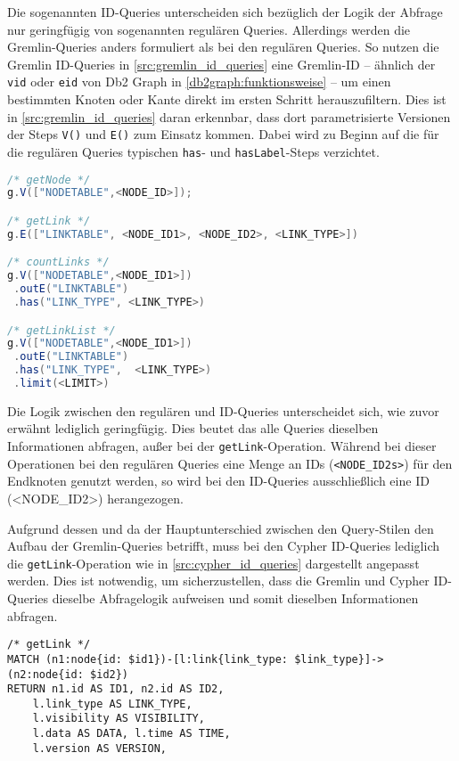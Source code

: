 Die sogenannten ID-Queries unterscheiden sich bezüglich der Logik der Abfrage nur geringfügig von sogenannten regulären Queries. Allerdings werden die Gremlin-Queries anders formuliert als bei den regulären Queries. So nutzen die Gremlin ID-Queries in \autoref{src:gremlin_id_queries} eine Gremlin-ID -- ähnlich der \texttt{vid} oder \texttt{eid} von Db2 Graph in \autoref{db2graph:funktionsweise} -- um einen bestimmten Knoten oder Kante direkt im ersten Schritt herauszufiltern. Dies ist in \autoref{src:gremlin_id_queries} daran erkennbar, dass dort parametrisierte Versionen der Steps \texttt{V()} und \texttt{E()} zum Einsatz kommen. Dabei wird zu Beginn auf die für die regulären Queries typischen \texttt{has}- und \texttt{hasLabel}-Steps verzichtet.

\begin{lstlisting}[label=src:gremlin_id_queries,caption={Gremlin ID-Queries},language=Java]
/* getNode */
g.V(["NODETABLE",<NODE_ID>]);

/* getLink */
g.E(["LINKTABLE", <NODE_ID1>, <NODE_ID2>, <LINK_TYPE>])

/* countLinks */
g.V(["NODETABLE",<NODE_ID1>])
 .outE("LINKTABLE")
 .has("LINK_TYPE", <LINK_TYPE>)

/* getLinkList */
g.V(["NODETABLE",<NODE_ID1>])
 .outE("LINKTABLE")
 .has("LINK_TYPE",  <LINK_TYPE>)
 .limit(<LIMIT>)
\end{lstlisting}

Die Logik zwischen den regulären und ID-Queries unterscheidet sich, wie zuvor erwähnt lediglich geringfügig. Dies beutet das alle Queries dieselben Informationen abfragen, außer bei der \texttt{getLink}-Operation. Während bei dieser Operationen bei den regulären Queries eine Menge an IDs (\texttt{<NODE\_ID2s>}) für den Endknoten genutzt werden, so wird bei den ID-Queries ausschließlich eine ID (<NODE\_ID2>) herangezogen. 

Aufgrund dessen und da der Hauptunterschied zwischen den Query-Stilen den Aufbau der Gremlin-Queries betrifft, muss bei den Cypher ID-Queries lediglich die \texttt{getLink}-Operation wie in \autoref{src:cypher_id_queries} dargestellt
angepasst werden. Dies ist notwendig, um sicherzustellen, dass die Gremlin und Cypher ID-Queries dieselbe Abfragelogik aufweisen und somit dieselben Informationen abfragen. 
\begin{lstlisting}[label=src:cypher_id_queries,caption={Cypher ID-Queries},language=CQL]
/* getLink */
MATCH (n1:node{id: $id1})-[l:link{link_type: $link_type}]->(n2:node{id: $id2}) 
RETURN n1.id AS ID1, n2.id AS ID2, 
    l.link_type AS LINK_TYPE, 
    l.visibility AS VISIBILITY, 
    l.data AS DATA, l.time AS TIME, 
    l.version AS VERSION,
\end{lstlisting}

